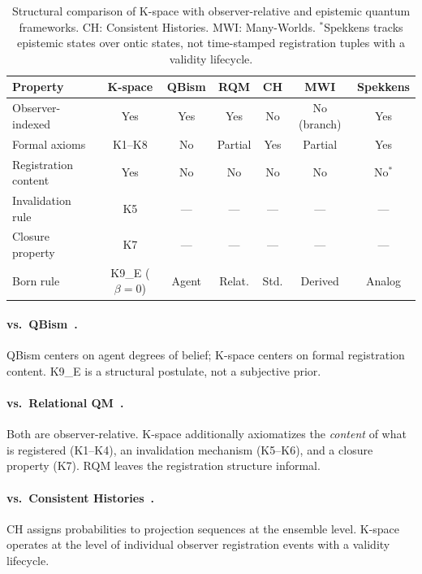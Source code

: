 \documentclass[12pt,a4paper]{article}
\theoremstyle{plain}
\theoremstyle{definition}
\theoremstyle{remark}
\begin{document}
\begin{table}[ht]
\centering\small
\caption{Structural comparison of K-space with observer-relative and
epistemic quantum frameworks. CH: Consistent Histories. MWI: Many-Worlds.
$^*$Spekkens tracks epistemic states over ontic states, not
time-stamped registration tuples with a validity lifecycle.}
\label{tab:comparison}
\begin{tabular}{@{}lcccccc@{}}
\toprule
\textbf{Property} & \textbf{K-space} & \textbf{QBism} &
\textbf{RQM} & \textbf{CH} & \textbf{MWI} & \textbf{Spekkens} \\
\midrule
Observer-indexed   & Yes         & Yes    & Yes     & No    & No (branch) & Yes     \\
Formal axioms      & K1--K8      & No     & Partial & Yes   & Partial     & Yes     \\
Registration content & Yes       & No     & No      & No    & No          & No$^*$  \\
Invalidation rule  & K5          & ---    & ---     & ---   & ---         & ---     \\
Closure property   & K7          & ---    & ---     & ---   & ---         & ---     \\
Born rule          & K9\_E ($\beta{=}0$) & Agent & Relat.& Std. & Derived & Analog \\
\bottomrule
\end{tabular}
\end{table}

\paragraph{vs.\ QBism~\cite{Fuchs2014}.}
QBism centers on agent degrees of belief; K-space centers on formal
registration content. K9\_E is a structural postulate, not a subjective
prior.

\paragraph{vs.\ Relational QM~\cite{Rovelli1996}.}
Both are observer-relative. K-space additionally axiomatizes the
\emph{content} of what is registered (K1--K4), an invalidation mechanism
(K5--K6), and a closure property (K7). RQM leaves the registration
structure informal.

\paragraph{vs.\ Consistent Histories~\cite{Griffiths2002}.}
CH assigns probabilities to projection sequences at the ensemble level.
K-space operates at the level of individual observer registration events
with a validity lifecycle.
\end{document}
